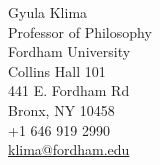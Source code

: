 Gyula Klima
\\Professor of Philosophy 
\\Fordham University 
\\Collins Hall 101
\\441 E. Fordham Rd
\\Bronx, NY 10458
\\+1 646 919 2990 
\\ \href{mailto:klima@fordham.edu}{klima@fordham.edu}
